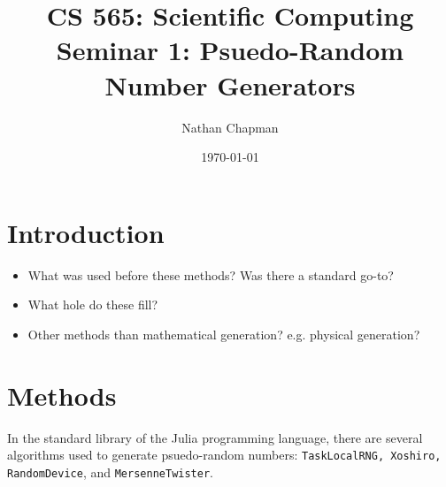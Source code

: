\documentclass{article}
\title{\vspace*{-0.625in}CS 565: Scientific Computing \\ Seminar 1: Psuedo-Random Number Generators}
\author{Nathan Chapman}
\date{\today}
\begin{document}
    \maketitle

    \section*{Introduction}

        \begin{itemize}
            \item What was used before these methods?  Was there a standard go-to?
            \item What hole do these fill?
            \item Other methods than mathematical generation?  e.g. physical generation?
        \end{itemize}
    
    \section*{Methods}

        In the standard library of the Julia programming language, there are several algorithms used to generate psuedo-random numbers\cite*{Julia-2017}: \texttt{TaskLocalRNG, Xoshiro, RandomDevice}, and \texttt{MersenneTwister}.

\end{document}
